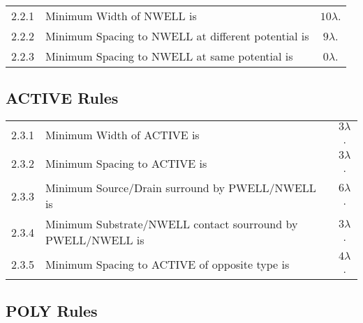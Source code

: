 \begin{center}
\end{center}

\begin{flushleft}
    \begin{tabular}{c l c}
        2.2.1  & Minimum Width of NWELL is & $10 \lambda$. \\
        2.2.2  & Minimum Spacing to NWELL at different potential is & $9 \lambda$. \\
        2.2.3  & Minimum Spacing to NWELL at same potential is & $0 \lambda$. \\
    \end{tabular}
\end{flushleft}

\subsection{ACTIVE Rules}\label{design_rules_active_rules}

\begin{flushleft}
    \begin{tabular}{c l c}
        2.3.1   & Minimum Width of ACTIVE is & $3 \lambda$. \\
        2.3.2   & Minimum Spacing to ACTIVE is & $3 \lambda$. \\
        2.3.3   & Minimum Source/Drain surround by PWELL/NWELL is & $6 \lambda$. \\
        2.3.4   & Minimum Substrate/NWELL contact sourround by PWELL/NWELL is & $3 \lambda$. \\
        2.3.5   & Minimum Spacing to ACTIVE of opposite type is & $4 \lambda$. \\
    \end{tabular}
\end{flushleft}

\subsection{POLY Rules}\label{design_rules_poly_rules}

